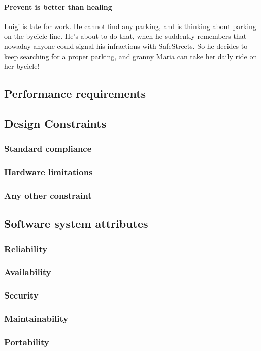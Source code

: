 \documentclass{article}
\begin{document}
			\paragraph{Prevent is better than healing}Luigi is late for work. He cannot find any parking, and is thinking about parking on the bycicle line. He's about to do that, when he suddently remembers that nowaday anyone could signal his infractions with SafeStreets. So he decides to keep searching for a proper parking, and granny Maria can take her daily ride on her bycicle!
	\subsection{Performance requirements}
	\subsection{Design Constraints}
		\subsubsection{Standard compliance}
		\subsubsection{Hardware limitations}
		\subsubsection{Any other constraint}
	\subsection{Software system attributes}
		\subsubsection{Reliability}
		\subsubsection{Availability}
		\subsubsection{Security}
		\subsubsection{Maintainability}
		\subsubsection{Portability}
\end{document}
